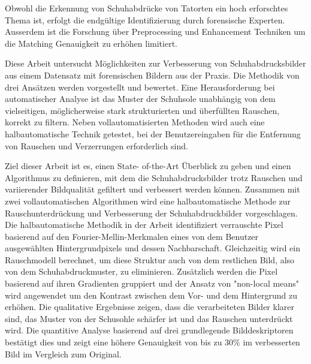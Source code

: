 \documentclass[draft,final]{vutinfth} %
\begin{document}
\begin{kurzfassung}
\par
Obwohl die Erkennung von Schuhabdrücke von Tatorten ein hoch erforschtes Thema ist, erfolgt die endgültige Identifizierung  durch forensische Experten.
Ausserdem ist die Forschung über Preprocessing und Enhancement Techniken um die Matching Genauigkeit zu erhöhen limitiert.
\par
Diese Arbeit untersucht Möglichkeiten zur Verbesserung von Schuhabdrucksbilder aus einem Datensatz mit forensischen Bildern aus der Praxis. 
Die Methodik von drei Ansätzen werden vorgestellt und bewertet. 
Eine Herausforderung bei automatischer Analyse ist das Muster der Schuhsole unabhängig von dem vielseitigen, möglicherweise stark strukturierten und überfüllten Rauschen, korrekt zu filtern.
Neben vollautomatisierten Methoden wird auch eine halbautomatische Technik getestet, bei der Benutzereingaben für die Entfernung von Rauschen und Verzerrungen erforderlich sind. 
\par
Ziel dieser Arbeit ist es, einen State- of-the-Art Überblick zu geben und einen Algorithmus zu definieren, mit dem die Schuhabdrucksbilder trotz Rauschen und variierender Bildqualität gefiltert und verbessert werden können.
Zusammen mit zwei vollautomatischen Algorithmen wird eine halbautomatische Methode zur Rauschunterdrückung und Verbesserung der Schuhabdruckbilder vorgeschlagen. 
Die halbautomatische Methodik in der Arbeit identifiziert verrauschte Pixel basierend auf den Fourier-Mellin-Merkmalen eines von dem Benutzer ausgewählten Hintergrundpixels und dessen Nachbarschaft. 
Gleichzeitig wird ein Rauschmodell berechnet, um diese Struktur auch von dem restlichen Bild, also von dem Schuhabdruckmuster, zu eliminieren. 
Zusätzlich werden die Pixel basierend auf ihren Gradienten gruppiert und der Ansatz von "non-local means" wird angewendet um den Kontrast zwischen dem Vor- und dem Hintergrund zu erhöhen.
Die qualitative Ergebnisse zeigen, dass die verarbeiteten Bilder klarer sind, das Muster von der Schusohle schärfer ist und das Rauschen unterdrückt wird.
Die quantitive Analyse basierend auf drei grundlegende Bilddeskriptoren bestätigt dies und zeigt eine höhere Genauigkeit von bis zu 30\% im verbesserten Bild im Vergleich zum Original.
\end{kurzfassung}
\end{document}
